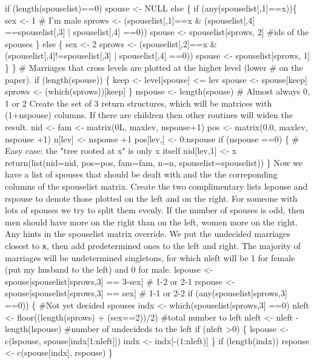 \documentclass{article}
\begin{document}
    if (length(spouselist)==0)  spouse <- NULL
    else \{
        if (any(spouselist[,1]==x))\{
            sex <- 1                              # I'm male
            sprows <- (spouselist[,1]==x & (spouselist[,4] ==spouselist[,3] |
                                            spouselist[,4] ==0))
            spouse <- spouselist[sprows, 2] #ids of the spouses
            \}
        else \{
            sex <- 2
            sprows <- (spouselist[,2]==x & (spouselist[,4]!=spouselist[,3] |
                                            spouselist[,4] ==0))
            spouse <- spouselist[sprows, 1]
            \}
        \}
    # Marriages that cross levels are plotted at the higher level (lower
    #  on the paper).
    if (length(spouse)) \{
        keep <- level[spouse] <= lev
        spouse <- spouse[keep]
        sprows <- (which(sprows))[keep]
        \}
    nspouse <- length(spouse)  # Almost always 0, 1 or 2
\nwendcode{}\nwdocspar
Create the set of 3 return structures, which will be matrices with
(1+nspouse) columns.
If there are children then other routines will widen the result.
\nwenddocs{}\plusendmoddef
    nid <- fam <- matrix(0L, maxlev, nspouse+1)
    pos <- matrix(0.0, maxlev, nspouse +1)
    n[lev] <- nspouse +1       
    pos[lev,] <- 0:nspouse
    if (nspouse ==0) \{   
        # Easy case: the "tree rooted at x" is only x itself
        nid[lev,1] <- x
        return(list(nid=nid, pos=pos, fam=fam, n=n, spouselist=spouselist))
        \}
\nwendcode{}\nwdocspar
Now we have a list of spouses that should be dealt with and 
the the correponding columns of the spouselist matrix.  
Create the two complimentary lists lspouse and rspouse to denote
those plotted on the left and on the right.  
For someone with lots of spouses we try to split them evenly.
If the number of spouses is odd, then men should have more on the
right than on the left, women more on the right.
Any hints in the spouselist matrix override.
We put the undecided marriages closest to {\tt{}x}, 
then add predetermined ones to the left and
right.
The majority of marriages will be undetermined singletons, for which
nleft will be 1 for female (put my husband to the left) and 0 for male.
\nwenddocs{}\plusendmoddef
    lspouse <- spouse[spouselist[sprows,3] == 3-sex] # 1-2 or 2-1
    rspouse <- spouse[spouselist[sprows,3] == sex]   # 1-1 or 2-2
    if (any(spouselist[sprows,3] ==0)) \{
        #Not yet decided spouses
        indx <- which(spouselist[sprows,3] ==0)
        nleft <- floor((length(sprows) + (sex==2))/2) #total number to left
        nleft <- nleft - length(lspouse)  #number of undecideds to the left
        if (nleft >0) \{
            lspouse <- c(lspouse, spouse[indx[1:nleft]])
            indx <- indx[-(1:nleft)]
          \}
        if (length(indx)) rspouse <- c(spouse[indx], rspouse)
      \}
\end{document}
